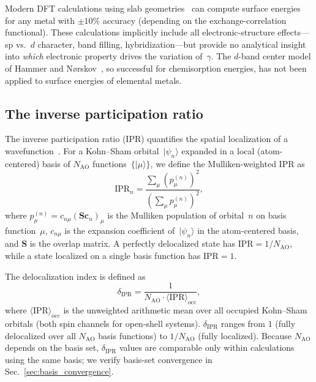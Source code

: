 \documentclass[twocolumn,showpacs,preprintnumbers,amsmath,amssymb,prb]{revtex4-2}
\begin{document}
Modern DFT calculations using slab
geometries~\cite{Vitos1998,SinghMiller2009,Tran2016}
can compute surface energies for any metal with
$\pm 10\%$ accuracy (depending on the exchange-correlation
functional).
These calculations implicitly include all electronic-structure
effects---sp vs.\ $d$ character, band filling,
hybridization---but provide no analytical insight into
\emph{which} electronic property drives the variation of~$\gamma$.
The $d$-band center model of Hammer and
N{\o}rskov~\cite{Hammer1995}, so successful for
chemisorption energies, has not been applied to
surface energies of elemental metals.

\subsection{The inverse participation ratio}

The inverse participation ratio (IPR) quantifies the spatial
localization of a wavefunction~\cite{Bell1970,Wegner1980}.
For a Kohn--Sham orbital~$|\psi_n\rangle$ expanded in a local
(atom-centered) basis of $N_\mathrm{AO}$ functions~$\{|\mu\rangle\}$,
we define the Mulliken-weighted IPR as
\begin{equation}
  \mathrm{IPR}_n = \frac{\sum_\mu (p_\mu^{(n)})^2}
                        {\left(\sum_\mu p_\mu^{(n)}\right)^2},
  \label{eq:ipr_def}
\end{equation}
where $p_\mu^{(n)} = c_{n\mu} (\mathbf{S} \mathbf{c}_n)_\mu$ is the
Mulliken population of orbital~$n$ on basis function~$\mu$,
$c_{n\mu}$ is the expansion coefficient of~$|\psi_n\rangle$
in the atom-centered basis, and $\mathbf{S}$ is the overlap matrix.
A perfectly delocalized state has
$\mathrm{IPR} = 1/N_\mathrm{AO}$, while a state localized on a
single basis function has $\mathrm{IPR} = 1$.

The delocalization index is defined as
\begin{equation}
  \delta_\mathrm{IPR} = \frac{1}{N_\mathrm{AO} \cdot
    \langle \mathrm{IPR} \rangle_\mathrm{occ}},
  \label{eq:delta_ipr}
\end{equation}
where $\langle \mathrm{IPR} \rangle_\mathrm{occ}$ is the
unweighted arithmetic mean over all occupied Kohn--Sham orbitals
(both spin channels for open-shell systems).
$\delta_\mathrm{IPR}$ ranges from $1$ (fully delocalized over
all $N_\mathrm{AO}$ basis functions) to $1/N_\mathrm{AO}$
(fully localized).
Because $N_\mathrm{AO}$ depends on the basis set,
$\delta_\mathrm{IPR}$ values are comparable only within
calculations using the same basis; we verify basis-set
convergence in Sec.~\ref{sec:basis_convergence}.
\end{document}
